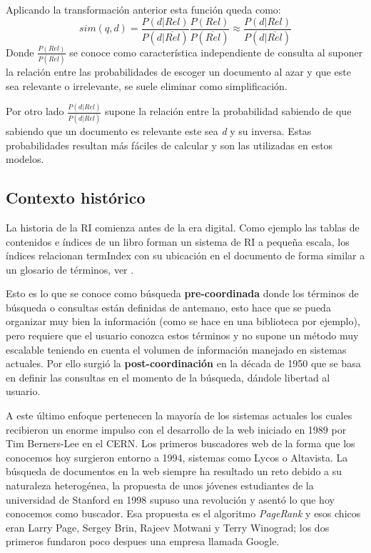 \begin{list}{}{}
Aplicando la transformación anterior esta función queda como:
\begin{equation}
sim(q,d) = \frac{P(d|Rel)}{P(d|\overline{Rel})}\frac{P(Rel)}{P(\overline{Rel})} \approx \frac{P(d|Rel)}{P(d|\overline{Rel})}
\end{equation}
Donde $\frac{P(Rel)}{P(\overline{Rel})}$ se conoce como característica independiente de consulta\label{modelProb} al suponer la relación entre las probabilidades de escoger un documento al azar y que este sea relevante o irrelevante, se suele eliminar como simplificación. 

Por otro lado $\frac{P(d|Rel)}{P(d|\overline{Rel})}$ supone la relación entre la probabilidad sabiendo de que sabiendo que un documento es relevante este sea \textit{d} y su inversa. Estas probabilidades resultan más fáciles de calcular y son las utilizadas en estos modelos.


\end{list}
\subsection{Contexto histórico}
La historia de la \acrshort{RI} comienza antes de la era digital. Como ejemplo las tablas de contenidos e índices de un libro forman un sistema de \acrshort{RI} a pequeña escala, los índices relacionan \gls{termIndex} con su ubicación en el documento de forma similar a un glosario de términos, ver  .

Esto es lo que se conoce como búsqueda \textbf{pre-coordinada} donde los términos de búsqueda o consultas están definidas de antemano, esto hace que se pueda organizar muy bien la información (como se hace en una biblioteca por ejemplo), pero requiere que el usuario conozca estos términos y no supone un método muy escalable teniendo en cuenta el volumen de información manejado en sistemas actuales. Por ello surgió la \textbf{post-coordinación} en la década de 1950 que se basa en definir las consultas en el momento de la búsqueda, dándole libertad al usuario.

A este último enfoque pertenecen la mayoría de los sistemas actuales los cuales recibieron un enorme impulso con el desarrollo de la web iniciado en 1989 por Tim Berners-Lee en el CERN. Los primeros buscadores web de la forma que los conocemos hoy surgieron entorno a 1994, sistemas como Lycos o Altavista. La búsqueda de documentos en la web siempre ha resultado un reto debido a su naturaleza heterogénea, la propuesta de unos jóvenes estudiantes de la universidad de Stanford en 1998 supuso una revolución y asentó lo que hoy conocemos como buscador. Esa propuesta es el algoritmo \textit{PageRank}\cite{PageRankPaper} y esos chicos eran Larry Page, Sergey Brin, Rajeev Motwani y Terry Winograd; los dos primeros fundaron poco despues una empresa llamada Google.


